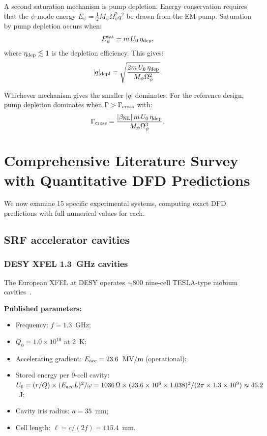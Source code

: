 \documentclass[12pt,aps,prd,twocolumn,superscriptaddress,nofootinbib]{revtex4-2}
\newcommand{\Opsi}{\Omega_\psi}
\newcommand{\Mpsi}{M_\psi}
\newcommand{\half}{\tfrac{1}{2}}
\begin{document}
A second saturation mechanism is pump depletion.  Energy conservation
requires that the $\psi$-mode energy $E_\psi = \half\Mpsi\Opsi^2 q^2$
be drawn from the EM pump.  Saturation by pump depletion occurs when:
\begin{equation}
E_\psi^{\rm sat} = m\,U_0\,\eta_{\rm dep},
\label{eq:pump_depletion}
\end{equation}
where $\eta_{\rm dep} \lesssim 1$ is the depletion efficiency.  This gives:
\begin{equation}
|q|_{\rm depl} = \sqrt{\frac{2m\,U_0\,\eta_{\rm dep}}{\Mpsi\Opsi^2}}.
\label{eq:q_depl}
\end{equation}

Whichever mechanism gives the smaller $|q|$ dominates.  For the
reference design, pump depletion dominates when $\Gamma > \Gamma_{\rm cross}$
with:
\begin{equation}
\Gamma_{\rm cross} = \frac{|\beta_{\rm NL}|\,m\,U_0\,\eta_{\rm dep}}
{\Mpsi\Opsi^3}.
\label{eq:Gamma_cross}
\end{equation}



\section{Comprehensive Literature Survey with Quantitative DFD Predictions}
\label{sec:literature}

We now examine 15 specific experimental systems, computing exact
DFD predictions with full numerical values for each.

\subsection{SRF accelerator cavities}

\subsubsection{DESY XFEL 1.3~GHz cavities}
\label{sec:desy}

The European XFEL at DESY operates $\sim 800$ nine-cell TESLA-type
niobium cavities~\cite{Aune2000}.

\textbf{Published parameters:}
\begin{itemize}[noitemsep]
\item Frequency: $f = 1.3$~GHz;
\item $Q_0 = 1.0\times10^{10}$ at 2~K;
\item Accelerating gradient: $E_{\rm acc} = 23.6$~MV/m (operational);
\item Stored energy per 9-cell cavity: $U_0 = (r/Q)\times(E_{\rm acc}L)^2/\omega
= 1036\,\Omega \times (23.6\times10^6\times1.038)^2/(2\pi\times1.3\times10^9)
\approx 46.2$~J;
\item Cavity iris radius: $a = 35$~mm;
\item Cell length: $\ell = c/(2f) = 115.4$~mm.
\end{itemize}
\end{document}

